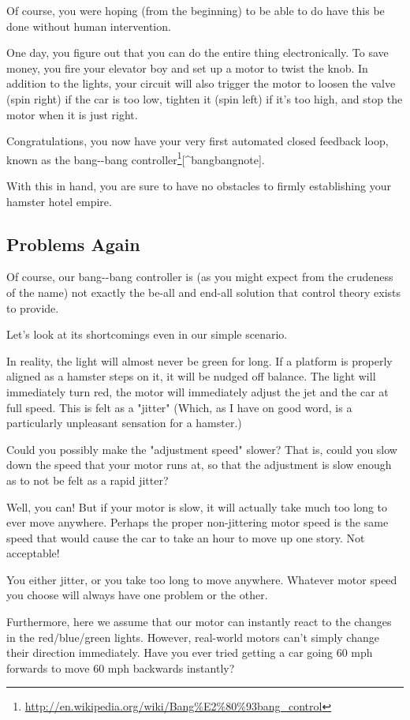 \documentclass[]{article}
\renewcommand{\href}[2]{#2\footnote{\url{#1}}}
\begin{document}
Of course, you were hoping (from the beginning) to be able to do have this be
done without human intervention.

One day, you figure out that you can do the entire thing electronically. To save
money, you fire your elevator boy and set up a motor to twist the knob. In
addition to the lights, your circuit will also trigger the motor to loosen the
valve (spin right) if the car is too low, tighten it (spin left) if it's too
high, and stop the motor when it is just right.

Congratulations, you now have your very first automated closed feedback loop,
known as the
\href{http://en.wikipedia.org/wiki/Bang\%E2\%80\%93bang_control}{bang-\/-bang
controller}{[}\^{}bangbangnote{]}.

With this in hand, you are sure to have no obstacles to firmly establishing your
hamster hotel empire.

\subsection{Problems Again}

Of course, our bang-\/-bang controller is (as you might expect from the
crudeness of the name) not exactly the be-all and end-all solution that control
theory exists to provide.

Let's look at its shortcomings even in our simple scenario.

In reality, the light will almost never be green for long. If a platform is
properly aligned as a hamster steps on it, it will be nudged off balance. The
light will immediately turn red, the motor will immediately adjust the jet and
the car at full speed. This is felt as a "jitter" (Which, as I have on good
word, is a particularly unpleasant sensation for a hamster.)

Could you possibly make the "adjustment speed" slower? That is, could you slow
down the speed that your motor runs at, so that the adjustment is slow enough as
to not be felt as a rapid jitter?

Well, you can! But if your motor is slow, it will actually take much too long to
ever move anywhere. Perhaps the proper non-jittering motor speed is the same
speed that would cause the car to take an hour to move up one story. Not
acceptable!

You either jitter, or you take too long to move anywhere. Whatever motor speed
you choose will always have one problem or the other.

Furthermore, here we assume that our motor can instantly react to the changes in
the red/blue/green lights. However, real-world motors can't simply change their
direction immediately. Have you ever tried getting a car going 60 mph forwards
to move 60 mph backwards instantly?
\end{document}
